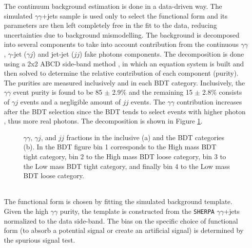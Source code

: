 The continuum background estimation is done in a data-driven way. The simulated $\gamma\gamma$+jets sample is used only to select the functional form and its parameters are then left completely free in the fit to the data, reducing uncertainties due to background mismodelling. The background is decomposed into several components to take into account contribution from the continuous $\gamma\gamma$, $\gamma$-jet ($\gamma j$) and jet-jet ($jj$) fake photons components. The decomposition is done using a 2x2 ABCD side-band method \cite{ABCD}, in which an equation system is built and then solved to determine the relative contribution of each component (purity). The purities are measured inclusively and in each BDT category. Inclusively, the $\gamma\gamma$ event purity is found to be 85 $\pm$ 2.9\% and the remaining 15 $\pm$ 2.8\% consists of $\gamma j$ events and a negligible amount of $jj$ events. The $\gamma\gamma$ contribution increases after the BDT selection since the BDT tends to select events with higher photon \pT, thus more real photons. The decomposition is shown in Figure \ref{fig:HHyybb:Modelling:Bkg:Decom}. 
\begin{figure}[htbp]
    \centering
    \caption{$\gamma\gamma$, $\gamma j$, and $jj$ fractions in the inclusive (a) and the BDT categories (b). In the BDT figure bin 1 corresponds to the High mass BDT tight category, bin 2 to the High mass BDT loose category, bin 3 to the Low mass BDT tight category, and finally bin 4 to the Low mass BDT loose category.}
    \label{fig:HHyybb:Modelling:Bkg:Decom}
\end{figure}
\\
The functional form is chosen by fitting the simulated background template. Given the high $\gamma\gamma$ purity, the template is constructed from the \texttt{SHERPA} $\gamma\gamma$+jets normalized to the data side-band. The bias on the specific choice of functional form (to absorb a potential signal or create an artificial signal) is determined by the spurious signal test. 

